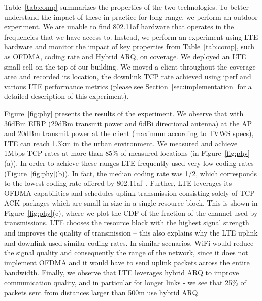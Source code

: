 Table~\ref{tab:comp} summarizes the properties of the two technologies. To better understand the impact of these in practice for long-range, we perform an outdoor experiment. We are unable to find 802.11af hardware that operates in the frequencies that we have access to. Instead, we perform an experiment using LTE hardware and monitor the impact of key properties from Table~\ref{tab:comp}, such as OFDMA, coding rate and Hybrid ARQ, on coverage. We deployed an LTE small cell on the top of our building. We moved a client throughout the coverage area and recorded its location, the downlink TCP rate achieved using iperf and various LTE performance metrics (please see Section~\ref{sec:implementation} for a detailed description of this experiment). 

Figure~\ref{fig:phy} presents the results of the experiment. 
We observe that with 36dBm EIRP (29dBm transmit power and 6dBi directional antenna) at the AP and 20dBm transmit power at the client (maximum according to TVWS specs), LTE can reach 1.3km in the urban environment.
We measured and achieve 1Mbps TCP rates at more than 85\% of measured locations (in Figure~\ref{fig:phy}(a)). 
In order to achieve these ranges LTE frequently used very low coding rates (Figure~\ref{fig:phy}(b)). 
In fact, the median coding rate was 1/2, which corresponds to the lowest coding rate offered by 802.11af~\cite{Rice_af}. 
Further, LTE leverages its OFDMA capabilities and schedules  
uplink transmission consisting solely of TCP ACK packages which are small in size
in a single resource block. This is shown in Figure~\ref{fig:phy}(c), where we plot the CDF of the fraction of the channel used by transmissions.
LTE chooses the resource block with the highest signal strength and improves the quality of transmission -- this also explains why the LTE uplink and downlink used similar coding rates. 
In similar scenarios, WiFi would reduce the signal quality and consequently the range of the network, 
since it does not implement OFDMA and it would have to send uplink packets across the entire bandwidth. 
Finally, we observe that LTE leverages hybrid ARQ to improve communication quality, and in particular for longer links - we see that 25\% of packets sent from distances larger than 500m use hybrid ARQ. 



